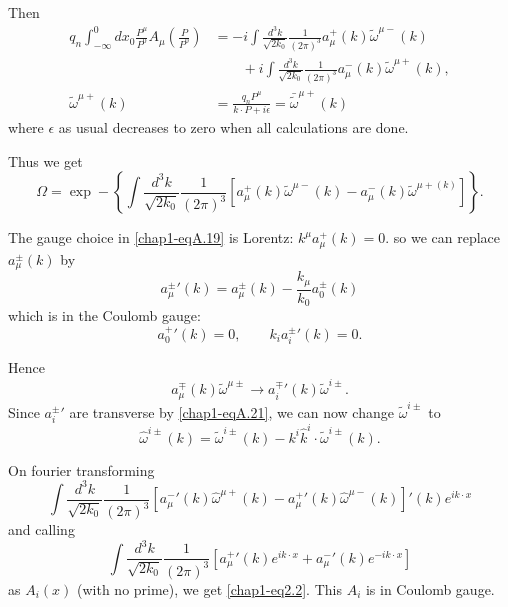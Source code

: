 Then
\begin{align*}
  q_n \int^0_{-\infty} dx_0 \frac{P^\mu}{P^0} A_\mu \left( \frac{P}{P^0}\right) & = -i \int \frac{d^3k}{\sqrt{2k_0}} \frac{1}{(2 \pi)^3} a_\mu^+ (k) \tilde{\omega}^{\mu -} (k)\\
  & \qquad + i \int \frac{d^3k}{\sqrt{2k_0}} \frac{1}{(2 \pi)^3} a_\mu^- (k) \tilde{\omega}^{\mu +}(k), \label{chap1-eqA.17}\tag{A.17}\\
  \tilde{\omega}^{\mu +} (k) & = \frac{q_n P^\mu}{k \cdot P + i\epsilon} = \bar{\tilde{\omega}}^{\mu +} (k) \label{chap1-eqA.18}\tag{A.18}
\end{align*}
where $\epsilon$ as usual decreases to zero when all calculations are done.

Thus we get
\begin{equation*}
\Omega = \exp - \left\{ \int \frac{d^3 k}{\sqrt{2k_0}} \frac{1}{(2 \pi)^3} \left[a_\mu^+ (k) \tilde{\omega}^{\mu -} (k) - a_\mu^- (k) \tilde{\omega}^{\mu + (k)} \right]\right\}. \label{chap1-eqA.19}\tag{A.19}
\end{equation*}

The gauge choice in \eqref{chap1-eqA.19} is Lorentz: $k^\mu a_\mu^+ (k) =0$. so we can replace $a_\mu^{\pm} (k)$ by
\begin{equation*}
{a_\mu^{\pm}}' (k) = a_\mu^{\pm} (k) - \frac{k_\mu}{k_0} a_0^\pm (k) \label{chap1-eqA.20}\tag{A.20}
\end{equation*}
which is in the Coulomb gauge:
\begin{equation*}
  {a_0^{+}}' (k) =0, \qquad k_i {a_i^\pm} ' (k) =0. \label{chap1-eqA.21}\tag{A.21}
\end{equation*}

Hence
\begin{equation*}
a_\mu^{\mp} (k) \tilde{\omega}^{\mu \pm} \to {a_i^{\mp}}' (k) \tilde{\omega}^{i \pm}. \label{chap1-eqA.22}\tag{A.22}
\end{equation*}
Since ${a_i^{\pm}}'$ are transverse by \eqref{chap1-eqA.21}, we can now change $\tilde{\omega}^{i \pm }$ to
\begin{equation*}
\hat{\omega}^{i \pm} (k) = \tilde{\omega}^{i \pm} (k) - k^i \hat{k}^i \cdot \tilde{\omega}^{i \pm}(k). \label{chap1-eqA.23}\tag{A.23}
\end{equation*}

On fourier transforming
\begin{equation*}
\int \frac{d^3k}{\sqrt{2k_0}} \frac{1}{(2 \pi)^3} \left[ {a_\mu^-}' (k) \hat{\omega}^{\mu +} (k) - {a_\mu^+}' (k) \hat{\omega}^{\mu -} (k)\right]' (k) e^{ik \cdot x} \label{chap1-eqA.24}\tag{A.24}
\end{equation*}
and calling
\begin{equation*}
\int \frac{d^3k}{\sqrt{2k_0}} \frac{1}{(2 \pi)^3} \left[ {a_\mu^+}' (k) e^{ik \cdot x} + {a_\mu^-}' (k) e^{-i k \cdot x}\right] \label{chap1-eqA.25}\tag{A.25}
\end{equation*}
as $A_i (x)$ (with no prime), we get \eqref{chap1-eq2.2}. This $A_i$ is in Coulomb gauge.


